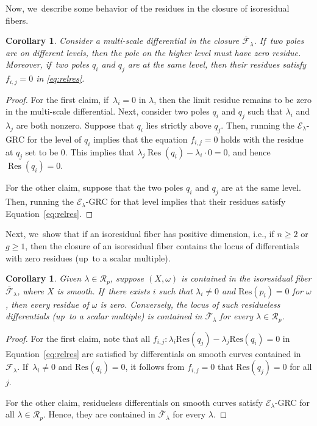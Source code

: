 \documentclass[11pt]{article}
\newcommand{\ie}{i.e.,\xspace}
\newcommand\calE{{\mathcal E}}
\newcommand\calF{{\mathcal F}}
\DeclareMathOperator\Res{Res}
\newtheorem{cor}[thm]{Corollary}
\theoremstyle{definition}
\begin{document}
Now, we~describe some behavior of the residues in the closure of isoresidual fibers.

\begin{cor}\label{cor:reszero}
Consider a multi-scale differential in the closure $\overline{\mathcal{F}}_{\lambda}$. If~two poles are on different levels, then the pole on the higher level must have zero residue. Moreover, if~two poles $q_i$ and $q_j$ are at the same level, then their residues satisfy $f_{i,j} = 0$ in \eqref{eq:relres}.
\end{cor}

\begin{proof}
For the first claim, if~$\lambda_i = 0$ in $\lambda$, then the limit residue remains to be zero in the multi-scale differential. Next,
consider two poles $q_{i}$ and $q_{j}$ such that $\lambda_{i}$ and $\lambda_{j}$ are both nonzero. Suppose that $q_{i}$ lies strictly above $q_{j}$.
Then, running the $\mathcal{E}_{\lambda}$-GRC for the level of $q_i$ implies that the equation $f_{i,j} = 0$ holds with the residue at $q_{j}$ set to be $0$. This implies that $\lambda_{j}\Res(q_{i})-\lambda_{i}\cdot 0=0$, and hence $\Res(q_{i})=0$.

For the other claim, suppose that the two poles $q_{i}$ and $q_{j}$ are at the same level. Then, running the $\mathcal{E}_{\lambda}$-GRC for that level implies that their residues satisfy Equation~\eqref{eq:relres}.
\end{proof}

Next, we~show that if an isoresidual fiber has positive dimension, \ie if $n\geq2$ or $g\geq1$, then the closure of an isoresidual fiber contains the locus of differentials with zero residues (up~to a scalar multiple).
\begin{cor}\label{cor:reszeros}
Given $\lambda\in \mathcal R_p$,
suppose $(X,\omega)$ is contained in the isoresidual fiber $\overline{\calF}_{\lambda}$, where $X$ is smooth. If~there exists $i$ such that $\lambda_i \neq 0$ and $\mathrm{Res}(p_i) =0$ for $\omega$,
then every residue of $\omega$ is zero. Conversely, the locus of such residueless differentials (up~to a scalar multiple) is contained in $\overline{\calF}_{\lambda}$ for every $\lambda\in \mathcal R_p$.
\end{cor}

\begin{proof}
For the first claim, note that all $f_{i,j}\colon\lambda_i \mathrm{Res}(q_j) - \lambda_j \mathrm{Res}(q_i)=0$ in Equation~\eqref{eq:relres} are satisfied by differentials on smooth curves contained in $\mathcal F_\lambda$. If~$\lambda_i \neq 0$ and $\mathrm{Res}(q_i)= 0$, it follows from $f_{i,j} = 0$ that $\mathrm{Res}(q_j)= 0$ for all $j$.

For the other claim, residueless differentials on smooth curves satisfy $\calE_{\lambda}$-GRC for all $\lambda \in \mathcal R_p$. Hence, they are contained in $\overline{\calF}_{\lambda}$ for every $\lambda$.
\end{proof}
\end{document}
